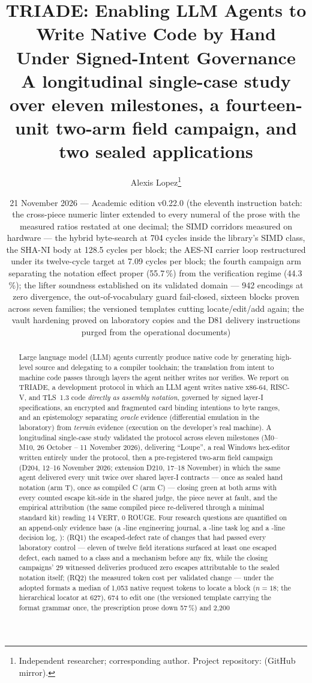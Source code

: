 \documentclass[11pt,a4paper]{article}
\title{\textbf{TRIADE: Enabling LLM Agents to Write Native Code by Hand\\
Under Signed-Intent Governance\\
\large A longitudinal single-case study over eleven milestones, a
fourteen-unit two-arm field campaign, and two sealed applications}}
\author{Alexis Lopez\thanks{Independent researcher; corresponding author.
Project repository: \code{alexisfrlopez-debug/triade} (GitHub mirror).}}
\date{21 November 2026 — Academic edition v0.22.0 (the eleventh instruction batch: the cross-piece numeric linter extended to every numeral of the prose with the measured ratios restated at one decimal; the SIMD corridors measured on hardware --- the hybrid byte-search at 704 cycles inside the library's SIMD class, the SHA-NI body at 128.5 cycles per block; the AES-NI carrier loop restructured under its twelve-cycle target at 7.09 cycles per block; the fourth campaign arm separating the notation effect proper (55.7\,\%) from the verification regime (44.3\,\%); the lifter soundness established on its validated domain --- 942 encodings at zero divergence, the out-of-vocabulary guard fail-closed, sixteen blocks proven across seven families; the versioned templates cutting locate/edit/add again; the vault hardening proved on laboratory copies and the D81 delivery instructions purged from the operational documents)}
\begin{document}
\maketitle
\thispagestyle{fancy}

\begin{abstract}
\noindent Large language model (LLM) agents currently produce native code by
generating high-level source and delegating to a compiler toolchain; the
translation from intent to machine code passes through layers the agent
neither writes nor verifies. We report on TRIADE, a development protocol in
which an LLM agent writes native x86-64, RISC-V, and TLS~1.3 code
\emph{directly as assembly notation}, governed by signed layer-I
specifications, an encrypted and fragmented card binding intentions to byte
ranges, and an epistemology separating \emph{oracle} evidence (differential
emulation in the laboratory) from \emph{terrain} evidence (execution on the
developer's real machine). A longitudinal single-case study validated the
protocol across eleven milestones (M0--M10, 26 October -- 11 November 2026),
delivering ``Loupe'', a real Windows hex-editor written entirely under the
protocol, then a pre-registered two-arm field campaign (D204, 12--16
November 2026; extension D210, 17--18 November) in which the same agent
delivered every unit twice over shared layer-I contracts --- once as sealed
hand notation (arm T), once as compiled C (arm C) --- closing green at both
arms with every counted escape kit-side in the shared judge, the piece
never at fault, and the empirical attribution (the same compiled piece
re-delivered through a minimal standard kit) reading 14 VERT, 0 ROUGE.
Four research questions are quantified on an append-only evidence base
(a \nbLignesJournal-line engineering journal, a \nbLignesWorklog-line
task log and a \nbLignesDecisions-line decision log, \plageDecisions):
(RQ1) the escaped-defect rate of changes that had passed every laboratory
control --- eleven of twelve field iterations surfaced at least one escaped
defect, each named to a class and a mechanism before any fix, while the
closing campaigns' 29 witnessed deliveries produced zero escapes
attributable to the sealed notation itself; (RQ2) the measured token cost
per validated change --- under the adopted formats a median of 1{,}053
native request tokens to locate a block ($n{=}18$; the hierarchical
locator at 627), 674 to edit one (the versioned template carrying the
format grammar once, the prescription prose down 57\,\%) and 2{,}200

\end{abstract}
\end{document}

